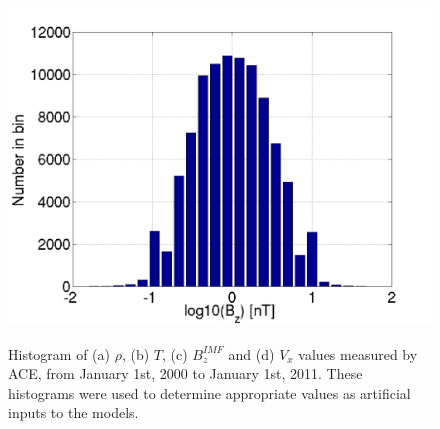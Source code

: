 \begin{figure}
{		\includegraphics[scale=0.35]{images/hist_BZ.png}
	    \label{fig:hist_bz}
	}\quad
    \caption{Histogram of (a) $\rho$, (b) $T$, (c) $B_z^{IMF}$ and (d) $V_x$
    values measured by ACE, from January 1st, 2000 to January 1st, 2011. These
    histograms were used to determine appropriate values as artificial inputs to the models.}
	\figSpace
\end{figure}

